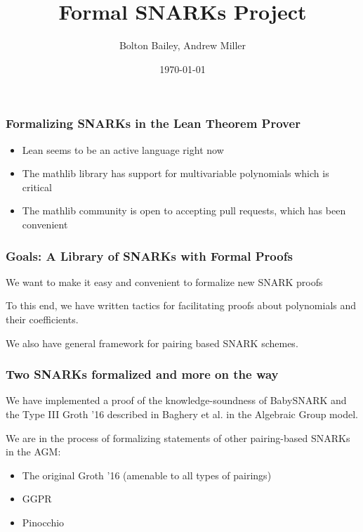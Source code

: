 \documentclass{beamer}
\title[Formal SNARKs Project]{Formal SNARKs Project} %
\author{Bolton Bailey, Andrew Miller} %
\institute[UIUC] %
{
University of Illinois Urbana-Champaign \\ %
\medskip
\textit{boltonb2@illinois.edu} %
}
\date{\today} %
\begin{document}
\begin{frame}
\titlepage %
\end{frame}

\begin{frame}
    \frametitle{Formalizing SNARKs in the Lean Theorem Prover}

    \begin{itemize}
        \item Lean seems to be an active language right now
        \item The mathlib library has support for multivariable polynomials which is critical
        \item The mathlib community is open to accepting pull requests, which has been convenient
    \end{itemize}    

\end{frame}

\begin{frame}
    \frametitle{Goals: A Library of SNARKs with Formal Proofs}
    
    We want to make it easy and convenient to formalize new SNARK proofs

    To this end, we have written tactics for facilitating proofs about polynomials and their coefficients.
    
    We also have general framework for pairing based SNARK schemes.

\end{frame}

\begin{frame}
    \frametitle{Two SNARKs formalized and more on the way}
    We have implemented a proof of the knowledge-soundness of BabySNARK and the Type III Groth '16 described in Baghery et al. in the Algebraic Group model.

    We are in the process of formalizing statements of other pairing-based SNARKs in the AGM:

    \begin{itemize}
        \item The original Groth '16 (amenable to all types of pairings)
        \item GGPR
        \item Pinocchio
    \end{itemize}    

\end{frame}
\end{document}
